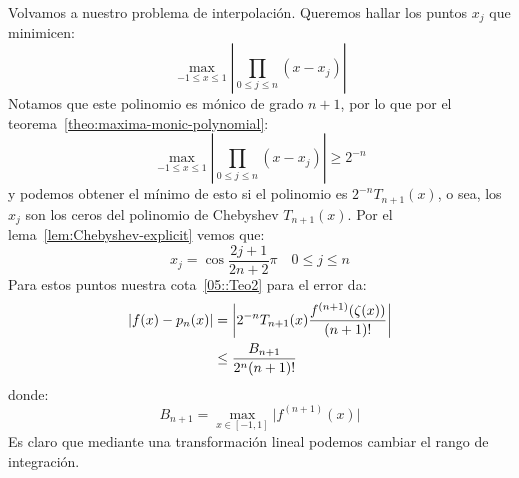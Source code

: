   Volvamos a nuestro problema de interpolación.
  Queremos hallar los puntos \(x_j\) que minimicen:
  \begin{equation*}
    \max_{-1 \le x \le 1}
      \left\lvert \prod_{0 \le j \le n} (x - x_j) \right\rvert
  \end{equation*}
  Notamos que este polinomio es mónico de grado \(n + 1\),
  por lo que por el teorema~\ref{theo:maxima-monic-polynomial}:
  \begin{equation*}
    \max_{-1 \le x \le 1}
      \left\lvert \prod_{0 \le j \le n} (x - x_j) \right\rvert
      \ge 2^{- n}
  \end{equation*}
  y podemos obtener el mínimo de esto
  si el polinomio es \(2^{-n} T_{n + 1}(x)\),
  o sea,
  los \(x_j\) son los ceros del polinomio de Chebyshev \(T_{n + 1}(x)\).
  Por el lema~\ref{lem:Chebyshev-explicit}
  vemos que:
  \begin{equation}
    \label{eq:Chebyshev-points}
    x_j
      = \cos \frac{2 j + 1}{2 n + 2} \pi
        \quad 0 \le j \le n
  \end{equation}
  Para estos puntos nuestra cota~\eqref{05::Teo2} para el error
  da:
  \begin{align}
    \lvert f(x) - p_n(x) \rvert
      &=   \left\lvert
             2^{-n} T_{n + 1}(x) \frac{f^{(n + 1)}(\zeta(x))}{(n + 1)!}
           \right\rvert \notag \\
      &\le \frac{B_{n + 1}}{2^n (n + 1)!}
             \label{eq.Chebyshev-error}
  \end{align}
  donde:
  \begin{equation}
    \label{eq:Chebyshev-error-coeff}
    B_{n + 1}
      = \max_{x \in [-1, 1]} \lvert f^{(n + 1)}(x) \rvert
  \end{equation}
  Es claro que mediante una transformación lineal
  podemos cambiar el rango de integración.

